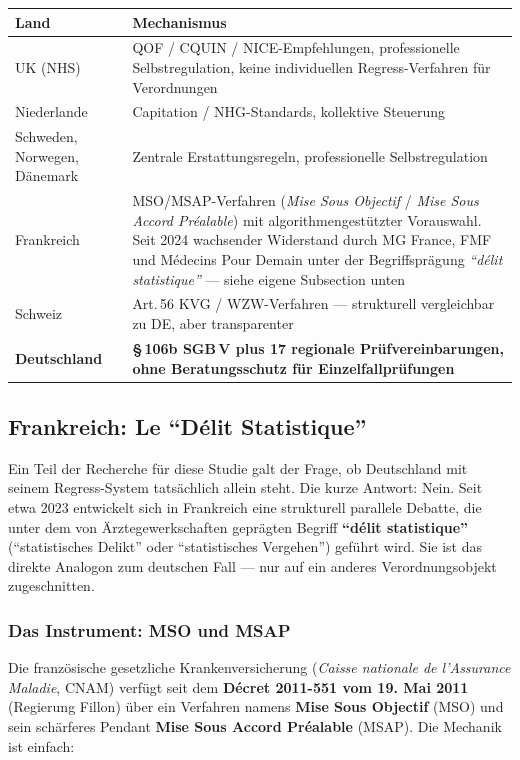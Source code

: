 \documentclass{umbruch-position}
\begin{document}
{\small
\begin{tabularx}{\textwidth}{X X}
\toprule
\textbf{Land} & \textbf{Mechanismus} \\
\midrule
UK (NHS) & QOF / CQUIN / NICE-Empfehlungen, professionelle Selbstregulation, keine individuellen Regress-Verfahren für Verordnungen \\
Niederlande & Capitation / NHG-Standards, kollektive Steuerung \\
Schweden, Norwegen, Dänemark & Zentrale Erstattungsregeln, professionelle Selbstregulation \\
Frankreich & MSO/MSAP-Verfahren (\textit{Mise Sous Objectif} / \textit{Mise Sous Accord Pr\'ealable}) mit algorithmengestützter Vorauswahl. Seit 2024 wachsender Widerstand durch MG France, FMF und Médecins Pour Demain unter der Begriffsprägung \textit{``d\'elit statistique''} --- siehe eigene Subsection unten \\
Schweiz & Art.\,56 KVG / WZW-Verfahren --- strukturell vergleichbar zu DE, aber transparenter \\
\textbf{Deutschland} & \textbf{\S\,106b SGB\,V plus 17 regionale Prüfvereinbarungen, ohne Beratungsschutz für Einzelfallprüfungen} \\
\bottomrule
\end{tabularx}
}

\subsection{Frankreich: Le ``D\'elit Statistique''}

Ein Teil der Recherche für diese Studie galt der Frage, ob Deutschland mit seinem Regress-System tatsächlich allein steht. Die kurze Antwort: Nein. Seit etwa 2023 entwickelt sich in Frankreich eine strukturell parallele Debatte, die unter dem von Ärztegewerkschaften geprägten Begriff \textbf{``d\'elit statistique''} (``statistisches Delikt'' oder ``statistisches Vergehen'') geführt wird. Sie ist das direkte Analogon zum deutschen Fall --- nur auf ein anderes Verordnungsobjekt zugeschnitten.

\subsubsection{Das Instrument: MSO und MSAP}

Die französische gesetzliche Krankenversicherung (\textit{Caisse nationale de l'Assurance Maladie}, CNAM) verfügt seit dem \textbf{D\'ecret 2011-551 vom 19. Mai 2011} (Regierung Fillon) über ein Verfahren namens \textbf{Mise Sous Objectif} (MSO) und sein schärferes Pendant \textbf{Mise Sous Accord Pr\'ealable} (MSAP). Die Mechanik ist einfach:
\end{document}
